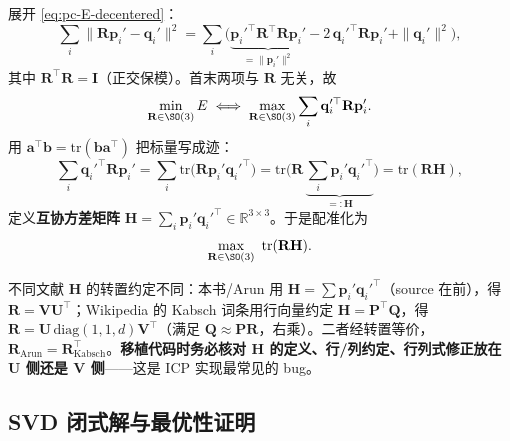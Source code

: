 \begin{derivation}
展开 \cref{eq:pc-E-decentered}：
\begin{equation}
  \sum_i\|\mathbf{R}\mathbf{p}_i'-\mathbf{q}_i'\|^2
  =\sum_i\Big(\underbrace{\mathbf{p}_i'^\top\mathbf{R}^\top\mathbf{R}\mathbf{p}_i'}_{=\|\mathbf{p}_i'\|^2}-2\,\mathbf{q}_i'^\top\mathbf{R}\mathbf{p}_i'+\|\mathbf{q}_i'\|^2\Big),
  \label{eq:pc-E-expand}
\end{equation}
其中 $\mathbf{R}^\top\mathbf{R}=\mathbf{I}$（正交保模）。首末两项与 $\mathbf{R}$ 无关，故
\begin{equation}
  \min_{\mathbf{R}\in\SO(3)}E\iff \max_{\mathbf{R}\in\SO(3)}\sum_i\mathbf{q}_i'^\top\mathbf{R}\mathbf{p}_i'.
  \label{eq:pc-trace-equiv}
\end{equation}
用 $\mathbf{a}^\top\mathbf{b}=\mathrm{tr}(\mathbf{b}\mathbf{a}^\top)$ 把标量写成迹：
\begin{equation}
  \sum_i\mathbf{q}_i'^\top\mathbf{R}\mathbf{p}_i'
  =\sum_i\mathrm{tr}\!\big(\mathbf{R}\mathbf{p}_i'\mathbf{q}_i'^\top\big)
  =\mathrm{tr}\!\Big(\mathbf{R}\,\underbrace{\textstyle\sum_i\mathbf{p}_i'\mathbf{q}_i'^\top}_{=:\mathbf{H}}\Big)=\mathrm{tr}(\mathbf{R}\mathbf{H}),
  \label{eq:pc-H}
\end{equation}
定义\textbf{互协方差矩阵} $\mathbf{H}=\sum_i\mathbf{p}_i'\mathbf{q}_i'^\top\in\mathbb{R}^{3\times3}$。于是配准化为
\begin{equation}
  \max_{\mathbf{R}\in\SO(3)}\ \mathrm{tr}(\mathbf{R}\mathbf{H}).
  \label{eq:pc-max-trace}
\end{equation}
\end{derivation}

\begin{note}
不同文献 $\mathbf{H}$ 的转置约定不同：本书/Arun 用 $\mathbf{H}=\sum\mathbf{p}_i'\mathbf{q}_i'^\top$（source 在前），得 $\mathbf{R}=\mathbf{V}\mathbf{U}^\top$；Wikipedia 的 Kabsch 词条用行向量约定 $\mathbf{H}=\mathbf{P}^\top\mathbf{Q}$，得 $\mathbf{R}=\mathbf{U}\,\mathrm{diag}(1,1,d)\mathbf{V}^\top$（满足 $\mathbf{Q}\approx\mathbf{P}\mathbf{R}$，右乘）。二者经转置等价，$\mathbf{R}_{\text{Arun}}=\mathbf{R}_{\text{Kabsch}}^\top$。\textbf{移植代码时务必核对 $\mathbf{H}$ 的定义、行/列约定、行列式修正放在 $\mathbf{U}$ 侧还是 $\mathbf{V}$ 侧}——这是 ICP 实现最常见的 bug。
\end{note}

\subsection{SVD 闭式解与最优性证明}
\label{sec:pc-icp-svd}

